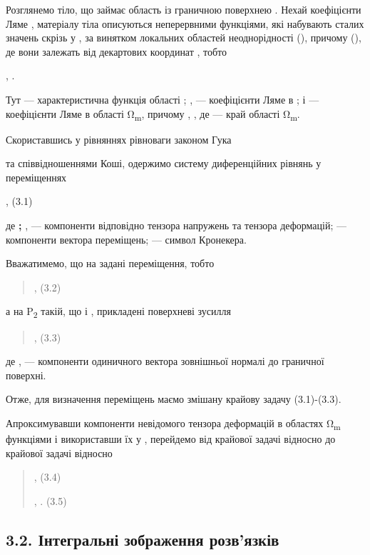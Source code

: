 Розглянемо тіло, що займає область із граничною поверхнею . Нехай
коефіцієнти Ляме , матеріалу тіла описуються неперервними функціями, які
набувають сталих значень скрізь у , за винятком локальних областей
неоднорідності (), причому (), де вони залежать від декартових координат
, тобто

, .

Тут --- характеристична функція області ; , --- коефіцієнти Ляме в ; і
--- коефіцієнти Ляме в області Ω\textsubscript{m}, причому , , де ---
край області Ω\textsubscript{m}.

Скориставшись у рівняннях рівноваги законом Гука

та співвідношеннями Коші, одержимо систему диференційних рівнянь у
переміщеннях

, (3.1)

де \textbf{;} , --- компоненти відповідно тензора напружень та тензора
деформацій; --- компоненти вектора переміщень; --- символ Кронекера.

Вважатимемо, що на задані переміщення, тобто

\begin{quote}
, (3.2)
\end{quote}

а на P\textsubscript{2} такій, що і , прикладені поверхневі зусилля

\begin{quote}
, (3.3)
\end{quote}

де , --- компоненти одиничного вектора зовнішньої нормалі до граничної
поверхні.

Отже, для визначення переміщень маємо змішану крайову задачу
(3.1)-(3.3).

Апроксимувавши компоненти невідомого тензора деформацій в областях
Ω\textsubscript{m} функціями і використавши їх у , перейдемо від
крайової задачі відносно до крайової задачі відносно

\begin{quote}
, (3.4)

, . (3.5)
\end{quote}

\hypertarget{ux456ux43dux442ux435ux433ux440ux430ux43bux44cux43dux456-ux437ux43eux431ux440ux430ux436ux435ux43dux43dux44f-ux440ux43eux437ux432ux44fux437ux43aux456ux432}{%
\subsection{3.2. Інтегральні зображення
розв'язків}\label{ux456ux43dux442ux435ux433ux440ux430ux43bux44cux43dux456-ux437ux43eux431ux440ux430ux436ux435ux43dux43dux44f-ux440ux43eux437ux432ux44fux437ux43aux456ux432}}

